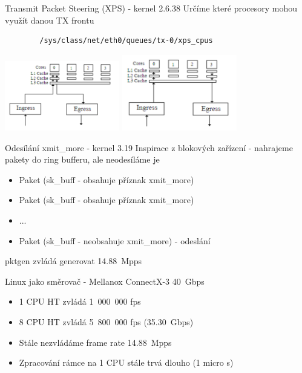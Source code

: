 \documentclass{beamer}
\begin{document}
\begin{frame}[fragile]{Transmit Packet Steering (XPS) - kernel 2.6.38}
	Určíme které procesory mohou využít danou TX frontu
	\begin{lstlisting}
		/sys/class/net/eth0/queues/tx-0/xps_cpus
	\end{lstlisting}

	\includegraphics[width=5cm,keepaspectratio]{fig/irq-cache.png}
	\includegraphics[width=5cm,keepaspectratio]{fig/irq-spread.png}
\end{frame}

\begin{frame}{Odesílání xmit\_more - kernel 3.19}
	Inspirace z blokových zařízení - nahrajeme pakety do ring bufferu, ale neodesíláme je
	\begin{itemize}
		\item Paket (sk\_buff - obsahuje příznak xmit\_more)
		\item Paket (sk\_buff - obsahuje příznak xmit\_more)
		\item ...
		\item Paket (sk\_buff - neobsahuje xmit\_more) - odeslání
	\end{itemize}
	pktgen zvládá generovat 14.88~Mpps
\end{frame}

\begin{frame}{Linux jako směrovač - Mellanox ConnectX-3 40~Gbps}
	\begin{itemize}
		\item 1 CPU HT zvládá 1~000~000 fps
		\item 8 CPU HT zvládá 5~800~000 fps (35.30~Gbps)
		\item Stále nezvládáme frame rate 14.88~Mpps
		\item Zpracování rámce na 1 CPU stále trvá dlouho (1 micro s)
	\end{itemize}
\end{frame}
\end{document}
